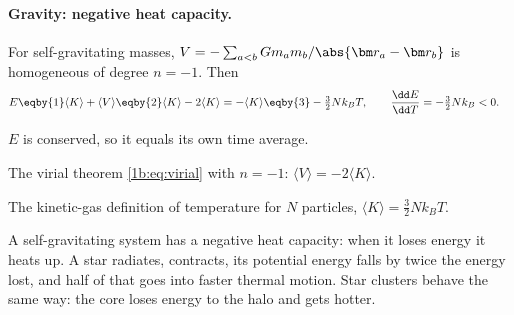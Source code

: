 \paragraph{Gravity: negative heat capacity.}
For self-gravitating masses, $V=-\sum_{a<b}Gm_am_b/\abs{\bm r_a-\bm r_b}$ is homogeneous
of degree $n=-1$. Then
\begin{align*}
  E
  &\eqby{1}\langle K\rangle+\langle V\rangle
   \eqby{2}\langle K\rangle-2\langle K\rangle
   =-\langle K\rangle
   \eqby{3}-\tfrac32Nk_BT,
  \qquad
  \frac{\dd E}{\dd T}=-\tfrac32Nk_B<0 .
\end{align*}
\begin{explain}
  \item $E$ is conserved, so it equals its own time average.
  \item The virial theorem \eqref{1b:eq:virial} with $n=-1$: $\langle V\rangle=-2\langle K\rangle$.
  \item The kinetic-gas definition of temperature for $N$ particles,
        $\langle K\rangle=\frac32Nk_BT$.
\end{explain}
A self-gravitating system has a negative heat capacity: when it loses energy it heats
up. A star radiates, contracts, its potential energy falls by twice the energy lost,
and half of that goes into faster thermal motion. Star clusters behave the same way:
the core loses energy to the halo and gets hotter.


